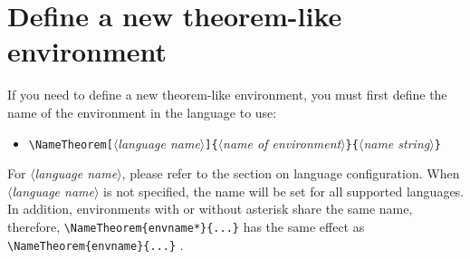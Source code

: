 \documentclass{simplivre}
\providecommand{\meta}[1]{$\langle${\normalfont\itshape#1}$\rangle$}
\begin{document}


\section{Define a new theorem-like environment}

If you need to define a new theorem-like environment, you must first define the name of the environment in the language to use:
\begin{itemize}
    \item \lstinline|\NameTheorem[|\meta{language name}\lstinline|]{|\meta{name of environment}\lstinline|}{|\meta{name string}\lstinline|}|
\end{itemize}
For \meta{language name}, please refer to the section on language configuration. When \meta{language name} is not specified, the name will be set for all supported languages. In addition, environments with or without asterisk share the same name, therefore, \lstinline|\NameTheorem{envname*}{...}| has the same effect as \lstinline|\NameTheorem{envname}{...}| .
\end{document}
